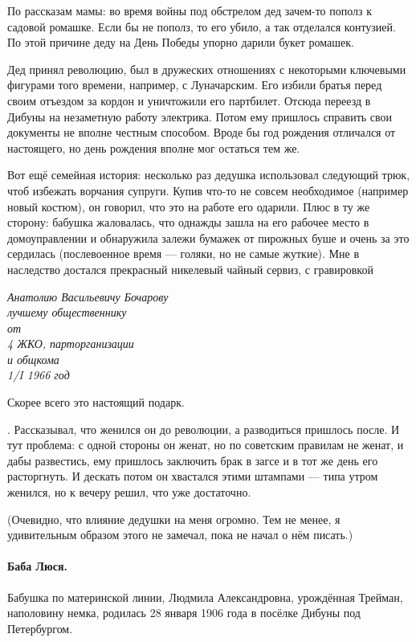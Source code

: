 \documentclass{book}
\begin{document}
\medskip

По рассказам мамы: во время войны под обстрелом дед зачем-то пополз к садовой ромашке.
Если бы не пополз, то его убило, а так отделался контузией.
По этой причине деду на День Победы упорно дарили букет ромашек.

Дед принял революцию, был в дружеских отношениях с некоторыми ключевыми фигурами того времени, например, с Луначарским.
Его избили братья перед своим отъездом за кордон и уничтожили его партбилет.
Отсюда переезд в Дибуны на незаметную работу электрика.
Потом ему пришлось справить свои документы не вполне честным способом.
Вроде бы год рождения отличался от настоящего, но день рождения вполне мог остаться тем же.

Вот ещё семейная история:
несколько раз дедушка использовал следующий трюк, чтоб избежать ворчания супруги.
Купив что-то не совсем необходимое (например новый костюм), он говорил, что это на работе его одарили.
Плюс в ту же сторону: бабушка жаловалась, что однажды зашла на его рабочее место в домоуправлении и обнаружила залежи бумажек от пирожных буше и очень за это сердилась (послевоенное время --- голяки, но не самые жуткие).
Мне в наследство достался прекрасный никелевый чайный сервиз, с гравировкой
\begin{center}
\textit{
Анатолию Васильевичу Бочарову\\
лучшему общественнику\\
от\\
4 ЖКО, парторганизации\\
и общкома\\
1/I 1966 год}
\end{center}
Скорее всего это настоящий подарк.

.
Рассказывал, что женился он до революции, а разводиться пришлось после.
И тут проблема: с одной стороны он женат, но по советским правилам не женат,
и дабы развестись, ему пришлось заключить брак в загсе и в тот же день его расторгнуть.
И дескать потом он хвастался этими штампами ---
типа утром женился, но к вечеру решил, что уже достаточно.

(Очевидно, что влияние дедушки на меня огромно.
Тем не менее, я удивительным образом этого не замечал, пока не начал о нём писать.)

\paragraph{Баба Люся.}
Бабушка по материнской линии, Людмила Александровна, урождённая Трейман, наполовину немка, родилась 28 января 1906 года в посёлке Дибуны под Петербургом.
\end{document}
